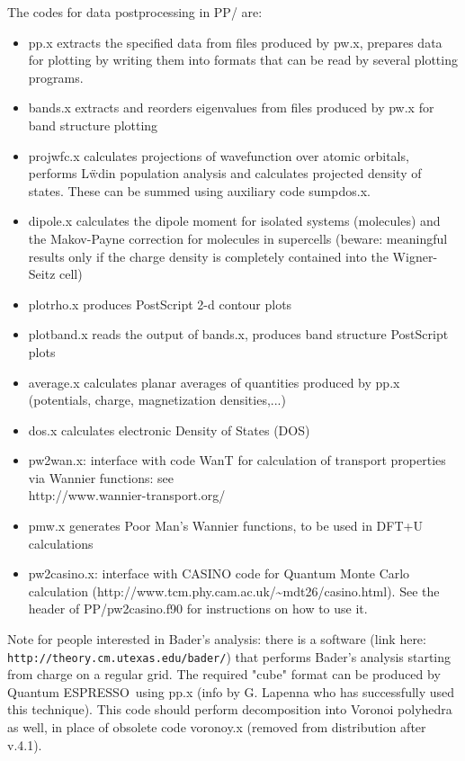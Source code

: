 \documentclass[12pt,a4paper]{article}
\def\qe{{\sc Quantum ESPRESSO}}
\begin{document}
The codes for data postprocessing in PP/ are:
\begin{itemize}
\item pp.x extracts the specified data from files produced by pw.x,
  prepares data for plotting by writing them into formats that can be
  read by several plotting programs. 
\item bands.x extracts and reorders eigenvalues from files produced by
  pw.x for band structure plotting 
\item projwfc.x calculates projections of wavefunction over atomic
  orbitals, performs L\"wdin population analysis and calculates
  projected density of states. These can be summed using auxiliary
  code sumpdos.x. 
\item dipole.x calculates the dipole moment for isolated systems
  (molecules) and the Makov-Payne correction for molecules in
  supercells (beware: meaningful results only if the charge density is
  completely contained into the Wigner-Seitz cell) 
\item plotrho.x produces PostScript 2-d contour plots
\item plotband.x reads the output of bands.x, produces band structure
  PostScript plots
\item average.x calculates planar averages of quantities produced by
  pp.x (potentials, charge, magnetization densities,...) 
\item dos.x calculates electronic Density of States (DOS)
\item pw2wan.x: interface with code WanT for calculation of transport
  properties via Wannier functions: see \\
  http://www.wannier-transport.org/ 
\item pmw.x generates Poor Man's Wannier functions, to be used in
  DFT+U calculations 
\item pw2casino.x: interface with CASINO code for Quantum Monte Carlo
  calculation (http://www.tcm.phy.cam.ac.uk/\~{}mdt26/casino.html).
  See the header of PP/pw2casino.f90 for instructions on how to use it.
\end{itemize}
Note for people interested in Bader's analysis: there is a software
(link here: \texttt{http://theory.cm.utexas.edu/bader/}) that performs
Bader's analysis starting from charge on a regular grid. The required 
"cube" format can be produced by \qe\ using pp.x (info by G. Lapenna
who has successfully used this technique). This code should perform 
decomposition into Voronoi polyhedra as well, in place of obsolete
code voronoy.x (removed from distribution after v.4.1).
\end{document}
